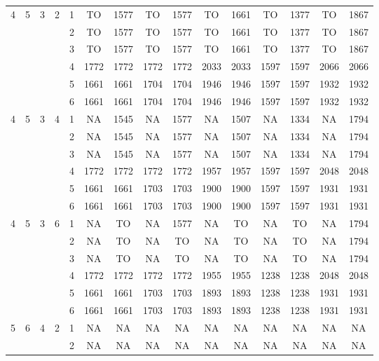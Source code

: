 \begin{longtable}{|c|c|c|c|c|c c|c c|c c|c c|c c|}
\multirow{6}{*}{4} & \multirow{6}{*}{5} & \multirow{6}{*}{3} & \multirow{6}{*}{2} & 1 & TO & 1577 & TO & 1577 & TO & 1661 & TO & 1377 & TO & 1867 \\
 & & & & 2 & TO & 1577 & TO & 1577 & TO & 1661 & TO & 1377 & TO & 1867 \\
 & & & & 3 & TO & 1577 & TO & 1577 & TO & 1661 & TO & 1377 & TO & 1867 \\
 & & & & 4 & 1772 & 1772 & 1772 & 1772 & 2033 & 2033 & 1597 & 1597 & 2066 & 2066 \\
 & & & & 5 & 1661 & 1661 & 1704 & 1704 & 1946 & 1946 & 1597 & 1597 & 1932 & 1932 \\
 & & & & 6 & 1661 & 1661 & 1704 & 1704 & 1946 & 1946 & 1597 & 1597 & 1932 & 1932 \\
\hline
\multirow{6}{*}{4} & \multirow{6}{*}{5} & \multirow{6}{*}{3} & \multirow{6}{*}{4} & 1 & NA & 1545 & NA & 1577 & NA & 1507 & NA & 1334 & NA & 1794 \\
 & & & & 2 & NA & 1545 & NA & 1577 & NA & 1507 & NA & 1334 & NA & 1794 \\
 & & & & 3 & NA & 1545 & NA & 1577 & NA & 1507 & NA & 1334 & NA & 1794 \\
 & & & & 4 & 1772 & 1772 & 1772 & 1772 & 1957 & 1957 & 1597 & 1597 & 2048 & 2048 \\
 & & & & 5 & 1661 & 1661 & 1703 & 1703 & 1900 & 1900 & 1597 & 1597 & 1931 & 1931 \\
 & & & & 6 & 1661 & 1661 & 1703 & 1703 & 1900 & 1900 & 1597 & 1597 & 1931 & 1931 \\
\hline
\multirow{6}{*}{4} & \multirow{6}{*}{5} & \multirow{6}{*}{3} & \multirow{6}{*}{6} & 1 & NA & TO & NA & 1577 & NA & TO & NA & TO & NA & 1794 \\
 & & & & 2 & NA & TO & NA & TO & NA & TO & NA & TO & NA & 1794 \\
 & & & & 3 & NA & TO & NA & TO & NA & TO & NA & TO & NA & 1794 \\
 & & & & 4 & 1772 & 1772 & 1772 & 1772 & 1955 & 1955 & 1238 & 1238 & 2048 & 2048 \\
 & & & & 5 & 1661 & 1661 & 1703 & 1703 & 1893 & 1893 & 1238 & 1238 & 1931 & 1931 \\
 & & & & 6 & 1661 & 1661 & 1703 & 1703 & 1893 & 1893 & 1238 & 1238 & 1931 & 1931 \\
\hline
\multirow{6}{*}{5} & \multirow{6}{*}{6} & \multirow{6}{*}{4} & \multirow{6}{*}{2} & 1 & NA & NA & NA & NA & NA & NA & NA & NA & NA & NA \\
 & & & & 2 & NA & NA & NA & NA & NA & NA & NA & NA & NA & NA \\

\end{longtable}
